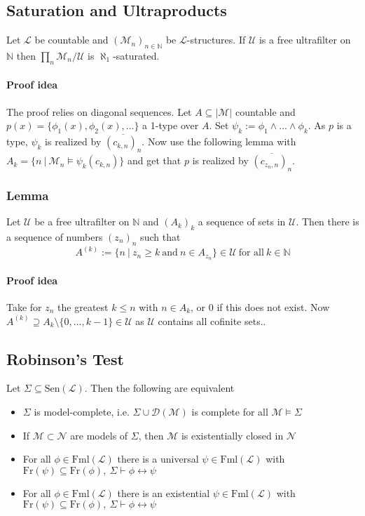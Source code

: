 \documentclass{scrartcl}
\newcommand{\N}{\mathbb{N}}
\begin{document}
\subsection{Saturation and Ultraproducts}
Let $\mathcal{L}$ be countable and $(\mathcal{M}_n)_{n \in \N}$ be $\mathcal{L}$-structures. If $\mathcal{U}$ is a free ultrafilter on $\N$ then $\prod_n \mathcal{M}_n/\mathcal{U}$ is $\aleph_1$-saturated.
\paragraph{Proof idea} The proof relies on diagonal sequences.
Let $A \subseteq |\mathcal{M}|$ countable and $p(x) = \{\phi_1(x), \phi_2(x), ...\}$ a 1-type over $A$. 
Set $\psi_k := \phi_1 \wedge ... \wedge \phi_k$.
As $p$ is a type, $\psi_k$ is realized by $\overline{(c_{k, n})_n}$. Now use the following lemma with $A_k = \{ n \ | \ \mathcal{M}_n \models \psi_k(c_{k, n}) \}$ and get that $p$ is realized by $\overline{(c_{z_n, n})_n}$.

\subsubsection{Lemma}
Let $\mathcal{U}$ be a free ultrafilter on $\N$ and $(A_k)_k$ a sequence of sets in $\mathcal{U}$. Then there is a sequence of numbers $(z_n)_n$ such that
\begin{equation*}
    A^{(k)} := \{ n \ | \ z_n \geq k \ \text{and} \ n \in A_{z_n} \} \in \mathcal{U} \ \text{for all} \ k \in \N
\end{equation*}
\paragraph{Proof idea} Take for $z_n$ the greatest $k \leq n$ with $n \in A_k$, or $0$ if this does not exist. Now $A^{(k)} \supseteq A_k \setminus \{ 0, ..., k - 1 \} \in \mathcal{U}$ as $\mathcal{U}$ contains all cofinite sets..

\subsection{Robinson's Test}
Let $\Sigma \subseteq \mathrm{Sen}(\mathcal{L})$. Then the following are equivalent
\begin{itemize}
    \item $\Sigma$ is model-complete, i.e. $\Sigma \cup \mathcal{D}(\mathcal{M})$ is complete for all $\mathcal{M} \models \Sigma$
    \item If $\mathcal{M} \subset \mathcal{N}$ are models of $\Sigma$, then $\mathcal{M}$ is existentially closed in $\mathcal{N}$
    \item For all $\phi \in \mathrm{Fml}(\mathcal{L})$ there is a universal $\psi \in \mathrm{Fml}(\mathcal{L})$ with $\mathrm{Fr}(\psi) \subseteq \mathrm{Fr}(\phi), \ \Sigma \vdash \phi \leftrightarrow \psi$
    \item For all $\phi \in \mathrm{Fml}(\mathcal{L})$ there is an existential $\psi \in \mathrm{Fml}(\mathcal{L})$ with $\mathrm{Fr}(\psi) \subseteq \mathrm{Fr}(\phi), \ \Sigma \vdash \phi \leftrightarrow \psi$
\end{itemize}
\end{document}

